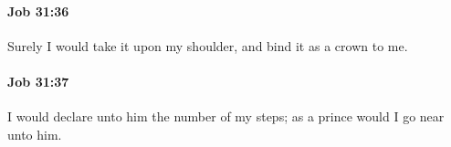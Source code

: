 		\paragraph{Job 31:36} %
			\label{JOB-31-36}

			Surely I would take it upon my shoulder, and bind it as a crown to me.


		\paragraph{Job 31:37} %
			\label{JOB-31-37}

			I would declare unto him the number of my steps; as a prince would I go near unto him.


